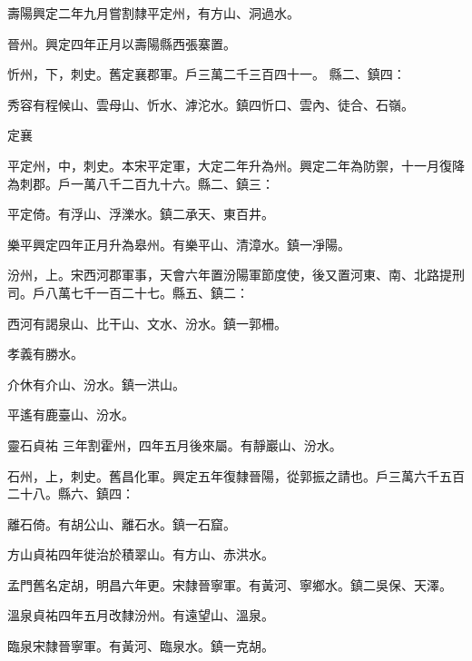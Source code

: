 \begin{pinyinscope}
 壽陽興定二年九月嘗割隸平定州，有方山、洞過水。



 晉州。興定四年正月以壽陽縣西張寨置。



 忻州，下，刺史。舊定襄郡軍。戶三萬二千三百四十一。
 縣二、鎮四：



 秀容有程候山、雲母山、忻水、滹沱水。鎮四忻口、雲內、徒合、石嶺。



 定襄



 平定州，中，刺史。本宋平定軍，大定二年升為州。興定二年為防禦，十一月復降為刺郡。戶一萬八千二百九十六。縣二、鎮三：



 平定倚。有浮山、浮濼水。鎮二承天、東百井。



 樂平興定四年正月升為皋州。有樂平山、清漳水。鎮一凈陽。



 汾州，上。宋西河郡軍事，天會六年置汾陽軍節度使，後又置河東、南、北路提刑司。戶八萬七千一百二十七。縣五、鎮二：



 西河有謁泉山、比干山、文水、汾水。鎮一郭柵。



 孝義有勝水。



 介休有介山、汾水。鎮一洪山。



 平遙有鹿臺山、汾水。



 靈石貞祐
 三年割霍州，四年五月後來屬。有靜巖山、汾水。



 石州，上，刺史。舊昌化軍。興定五年復隸晉陽，從郭振之請也。戶三萬六千五百二十八。縣六、鎮四：



 離石倚。有胡公山、離石水。鎮一石窟。



 方山貞祐四年徙治於積翠山。有方山、赤洪水。



 孟門舊名定胡，明昌六年更。宋隸晉寧軍。有黃河、寧鄉水。鎮二吳保、天澤。



 溫泉貞祐四年五月改隸汾州。有遠望山、溫泉。



 臨泉宋隸晉寧軍。有黃河、臨泉水。鎮一克胡。




\end{pinyinscope}
